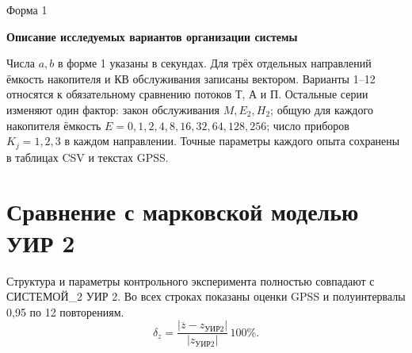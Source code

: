 \documentclass[12pt,a4paper]{article}
\begin{document}
\noindent\begin{minipage}{\textwidth}\noindent\hfill Форма 1\par\begin{center}\textbf{Описание исследуемых вариантов организации системы}\end{center}
\begin{center}\small\renewcommand{\arraystretch}{1.3}
\end{center}

\end{minipage}\par\medskip

Числа \(a,b\) в форме 1 указаны в секундах. Для трёх отдельных направлений ёмкость накопителя и КВ обслуживания записаны вектором. Варианты 1--12 относятся к обязательному сравнению потоков Т, А и П. Остальные серии изменяют один фактор: закон обслуживания \(M,E_2,H_2\); общую для каждого накопителя ёмкость \(E=0,1,2,4,8,16,32,64,128,256\); число приборов \(K_j=1,2,3\) в каждом направлении. Точные параметры каждого опыта сохранены в таблицах CSV и текстах GPSS.


\section{Сравнение с марковской моделью УИР 2}
Структура и параметры контрольного эксперимента полностью совпадают с СИСТЕМОЙ\_2 УИР 2. Во всех строках показаны оценки GPSS и полуинтервалы 0,95 по 12 повторениям.
\begin{equation}
\delta_z=\frac{|\overline z-z_{\text{УИР2}}|}{|z_{\text{УИР2}}|}\,100\%.
\end{equation}
\end{document}
